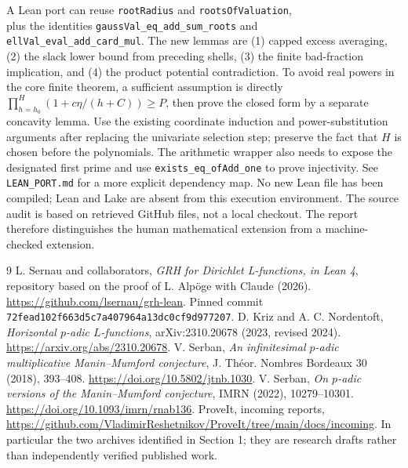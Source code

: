 \documentclass[11pt]{article}
\theoremstyle{remark}\newtheorem{remark}[theorem]{Remark}
\begin{document}
A Lean port can reuse \texttt{rootRadius} and \texttt{rootsOfValuation},\\
plus the identities \texttt{gaussVal\_eq\_add\_sum\_roots} and\\
\texttt{ellVal\_eval\_add\_card\_mul}. The new lemmas are (1) capped
excess averaging, (2) the slack lower bound from preceding shells,
(3) the finite bad-fraction implication, and (4) the product potential
contradiction. To avoid real powers in the core finite theorem, a
sufficient assumption is directly
$\prod_{h=h_0}^H(1+c\eta/(h+C))\ge P$, then prove the closed form by a
separate concavity lemma. Use the existing coordinate induction and
power-substitution arguments after replacing the univariate selection
step; preserve the fact that $H$ is chosen before the polynomials.
The arithmetic wrapper also needs to expose the designated first prime
and use \texttt{exists\_eq\_ofAdd\_one} to prove injectivity. See
\texttt{LEAN\_PORT.md} for a more explicit dependency map.
No new Lean file has been compiled; Lean and Lake are absent from this
execution environment. The source audit is based on retrieved GitHub
files, not a local checkout. The report therefore distinguishes the
human mathematical extension from a machine-checked extension.

\begin{thebibliography}{9}
 L. Sernau and collaborators, \emph{GRH for Dirichlet
L-functions, in Lean 4}, repository based on the proof of L. Alp\"oge
with Claude (2026). \url{https://github.com/lsernau/grh-lean}.
Pinned commit \texttt{72fead102f663d5c7a407964a13dc0cf9d977207}.
 D. Kriz and A. C. Nordentoft, \emph{Horizontal $p$-adic
$L$-functions}, arXiv:2310.20678 (2023, revised 2024).
\url{https://arxiv.org/abs/2310.20678}.
 V. Serban, \emph{An infinitesimal $p$-adic
multiplicative Manin--Mumford conjecture}, J. Th\'eor. Nombres Bordeaux
30 (2018), 393--408. \url{https://doi.org/10.5802/jtnb.1030}.
 V. Serban, \emph{On $p$-adic versions of the
Manin--Mumford conjecture}, IMRN (2022), 10279--10301.
\url{https://doi.org/10.1093/imrn/rnab136}.
 ProveIt, incoming reports,
\url{https://github.com/VladimirReshetnikov/ProveIt/tree/main/docs/incoming}.
In particular the two archives identified in Section 1; they are
research drafts rather than independently verified published work.
\end{thebibliography}
\end{document}
